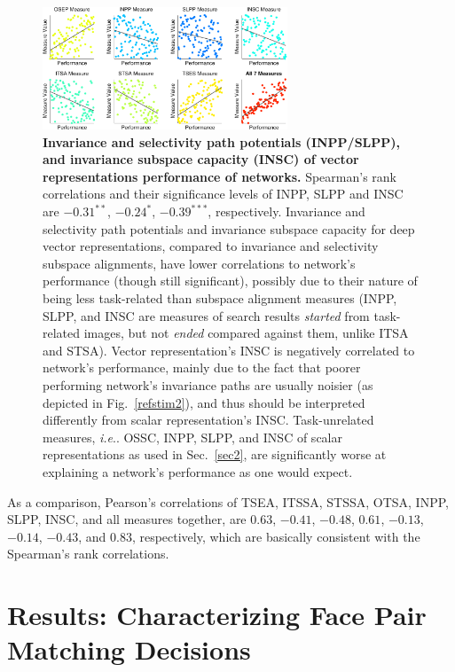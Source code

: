 \documentclass{article} %
\makeatletter
\DeclareRobustCommand\onedot{\futurelet\@let@token\@onedot}
\def\@onedot{\ifx\@let@token.\else.\null\fi\xspace}
\def\ie{\emph{i.e}\onedot} \def\Ie{\emph{I.e}\onedot}
\makeatother
\begin{document}
\begin{figure}[H]
\centering \includegraphics[width=0.65\textwidth, trim=25ex 27ex 0 0, clip]{Figs_supp/e_fig7_scatter.pdf}
\caption{ 
{\bf Invariance and selectivity path potentials (INPP/SLPP), and invariance subspace capacity (INSC) of vector representations \vs performance of networks.} Spearman's rank correlations and their significance levels of INPP, SLPP and INSC are $-0.31^{\ast\ast}$, $-0.24^{\ast}$, $-0.39^{\ast\ast\ast}$, respectively.
Invariance and selectivity path potentials and invariance subspace capacity for deep vector representations, compared to invariance and selectivity subspace alignments, have lower correlations to network's performance (though still significant), possibly due to their nature of being less task-related than subspace alignment measures (INPP, SLPP, and INSC are measures of search results \emph{started} from task-related images, but not \emph{ended} compared against them, unlike ITSA and STSA).
Vector representation's INSC is negatively correlated to network's performance, mainly due to the fact that poorer performing network's invariance paths are usually noisier (as depicted in Fig.~\ref{refstim2}), and thus should be interpreted differently from scalar representation's INSC.
Task-unrelated measures, \ie OSSC, INPP, SLPP, and INSC of scalar representations as used in Sec.~\ref{sec2}, are significantly worse at explaining a network's performance as one would expect.
}
\end{figure}

As a comparison, Pearson's correlations of TSEA, ITSSA, STSSA, OTSA, INPP, SLPP, INSC, and all measures together, are $0.63$, $-0.41$, $-0.48$, $0.61$, $-0.13$, $-0.14$, $-0.43$, and $0.83$, respectively, which are basically consistent with the Spearman's rank correlations.


\section{Results: Characterizing Face Pair Matching Decisions}
\end{document}
